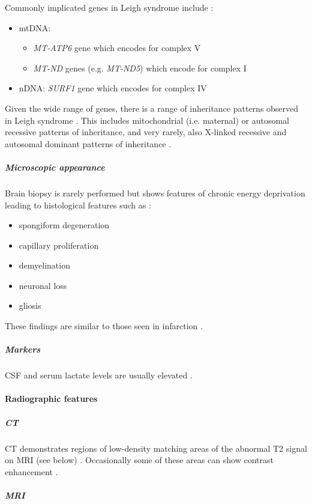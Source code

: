 Commonly implicated genes in Leigh syndrome include :

\begin{itemize}
	\item
	mtDNA:
	
	\begin{itemize}
		\item
		\emph{MT-ATP6} gene which encodes for complex V
		\item
		\emph{MT-ND} genes (e.g. \emph{MT-ND5}) which encode for complex I
	\end{itemize}
	\item
	nDNA: \emph{SURF1} gene which encodes for complex IV
\end{itemize}

Given the wide range of genes, there is a range of inheritance patterns observed in Leigh syndrome . This includes mitochondrial (i.e. maternal) or autosomal recessive patterns of inheritance, and very rarely, also X-linked recessive and autosomal dominant patterns of inheritance .

\subparagraph{Microscopic appearance}

Brain biopsy is rarely performed but shows features of chronic energy deprivation leading to histological features such as :

\begin{itemize}
	\item
	spongiform degeneration
	\item
	capillary proliferation
	\item
	demyelination
	\item
	neuronal loss
	\item
	gliosis
\end{itemize}

These findings are similar to those seen in infarction .

\subparagraph{Markers}

CSF and serum lactate levels are usually elevated .

\paragraph{Radiographic features}

\subparagraph{CT}

CT demonstrates regions of low-density matching areas of the abnormal T2 signal on MRI (see below) . Occasionally some of these areas can show contrast enhancement .

\subparagraph{MRI}

